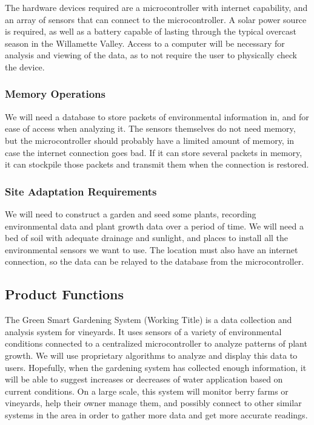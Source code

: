 \documentclass[IEEEtran,letterpaper,10pt,titlepage,fleqn,draftclsnofoot,onecolumn]{article}
\begin{document}
The hardware devices required are a microcontroller with internet capability, and an array of sensors that can connect to the microcontroller. A solar power source is required, as well as a battery capable of lasting through the typical overcast season in the Willamette Valley. Access to a computer will be necessary for analysis and viewing of the data, as to not require the user to physically check the device.

\subsubsection{Memory Operations}

We will need a database to store packets of environmental information in, and for ease of access when analyzing it. The sensors themselves do not need memory, but the microcontroller should probably have a limited amount of memory, in case the internet connection goes bad. If it can store several packets in memory, it can stockpile those packets and transmit them when the connection is restored.  

\subsubsection{Site Adaptation Requirements}

We will need to construct a garden and seed some plants, recording environmental data and plant growth data over a period of time. We will need a bed of soil with adequate drainage and sunlight, and places to install all the environmental sensors we want to use. The location must also have an internet connection, so the data can be relayed to the database from the microcontroller. 

\subsection{Product Functions}

The Green Smart Gardening System (Working Title) is a data collection and analysis system for vineyards. It uses sensors of a variety of environmental conditions connected to a centralized microcontroller to analyze patterns of plant growth. We will use proprietary algorithms to analyze and display this data to users. Hopefully, when the gardening system has collected enough information, it will be able to suggest increases or decreases of water application based on current conditions. On a large scale, this system will monitor berry farms or vineyards, help their owner manage them, and possibly connect to other similar systems in the area in order to gather more data and get more accurate readings. 
\end{document}
